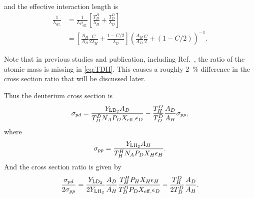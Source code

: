 \documentclass[../main.tex]{subfiles}
\begin{document}
and the effective interaction length is
\begin{equation}
	\begin{split}
		\frac{1}{\lambda_{\mathrm{eff.}}} &= \frac{1}{L\rho_{\mathrm{eff.}}} \left[\frac{T_D^H}{\lambda_H} +\frac{T_D^D}{\lambda_D}\right]\\
		&=\left[\frac{A_H}{A_D}\frac{C}{2\lambda_H} + \frac{1-C/2}{\lambda_D}\right]\left( \frac{A_H}{A_D}\frac{C}{2} +(1-C/2)\right)^{-1}.
	\end{split}
\end{equation}

Note that in previous studies and publication, including Ref.~\cite{dove2021}, the ratio of the atomic mass
is missing in \cref{eq:TDH}. This causes a roughly \SI{2}{\percent} difference in the cross section ratio
that will be discussed later.

Thus the deuterium cross section is
\begin{equation}
	\sigma_{pd} = \frac{Y_{\ce{LD_2}} A_D}{T_D^D N_A P_D X_{\mathrm{eff.}} \epsilon_D} - \frac{T^D_H}{T_D^D} \frac{A_D}{A_H} \sigma_{pp},
\end{equation}
where
\begin{equation}
	\sigma_{pp} = \frac{Y_{\ce{LH_2}} A_H}{T_H^H N_A P_D X_{H} \epsilon_H}.
\end{equation}
And the cross section ratio is given by
\begin{equation}
	\frac{\sigma_{pd}}{2\sigma_{pp}} = \frac{Y_{\ce{LD_2}}}{2Y_{\ce{LH2}}}\frac{A_D}{A_H}\frac{T_H^H P_H X_{H} \epsilon_H}{T_D^D P_D X_{\mathrm{eff.}} \epsilon_D} - \frac{T^D_H}{2T_D^D} \frac{A_D}{A_H}.
\end{equation}
\end{document}
